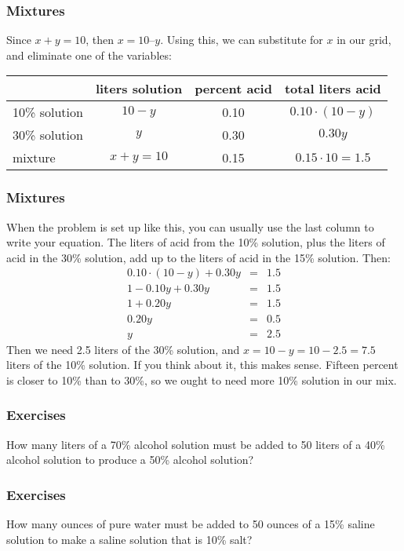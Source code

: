 \documentclass[xcolor=dvipsnames]{beamer}
\begin{document}
\begin{frame}
  \frametitle{Mixtures}
  Since $x+y=10$, then $x=10–y$. Using this, we can substitute for $x$
  in our grid, and eliminate one of the variables:

  \bigskip

  \begin{tabular}{|l|c|c|c|}\hline
    & liters solution & percent acid & total liters acid \\ \hline
    10\% solution & $10-y$ & 0.10 & $0.10\cdot(10-y)$ \\ \hline
    30\% solution & $y$ & 0.30 & $0.30y$ \\ \hline
    mixture & $x+y=10$ & 0.15 & $0.15\cdot{}10=1.5$ \\ \hline
  \end{tabular}
\end{frame}

\begin{frame}
  \frametitle{Mixtures}
  When the problem is set up like this, you can usually use the last
  column to write your equation. The liters of acid from the 10\%
  solution, plus the liters of acid in the 30\% solution, add up to
  the liters of acid in the 15\% solution. Then:
  \begin{equation}
    \label{eq:voocoshi}
    \begin{array}{rcl}
      0.10\cdot(10-y)+0.30y&=&1.5 \\
      1-0.10y+0.30y&=&1.5 \\
      1+0.20y&=&1.5 \\
      0.20y&=&0.5 \\
      y&=&2.5
    \end{array}
  \end{equation}
  Then we need 2.5 liters of the 30\% solution, and
  $x=10-y=10-2.5=7.5$ liters of the 10\% solution. If you think about
  it, this makes sense. Fifteen percent is closer to 10\% than to
  30\%, so we ought to need more 10\% solution in our mix.
\end{frame}

\begin{frame}
  \frametitle{Exercises}
  {\ubung} How many liters of a 70\% alcohol solution must be added to
  50 liters of a 40\% alcohol solution to produce a 50\% alcohol
  solution?
\end{frame}

\begin{frame}
  \frametitle{Exercises}
  {\ubung} How many ounces of pure water must be added to 50 ounces of
  a 15\% saline solution to make a saline solution that is 10\% salt?
\end{frame}
\end{document}
